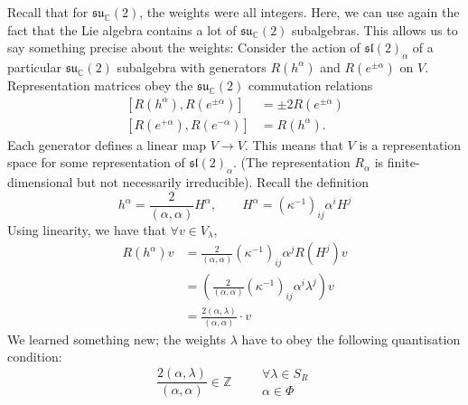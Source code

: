 Recall that for $\mathfrak{su}_{\mathbb{C}}(2)$, the weights were all integers.
Here, we can use again the fact that the Lie algebra contains a lot of $\mathfrak{su}_{\mathbb{C}}(2)$ subalgebras.  This allows us to say something precise about the weights:
Consider the action of $\mathfrak{sl}(2)_\alpha$ of a particular $\mathfrak{su}_{\mathbb{C}}(2)$ subalgebra
with generators $R(h^\alpha)$ and $R(e^{\pm\alpha})$ on $V$.
Representation matrices obey the  $\mathfrak{su}_{\mathbb{C}}(2)$  commutation relations
\begin{subequations}
  \begin{align}
    [R(h^\alpha), R(e^{\pm \alpha})] &= \pm 2 R(e^{\pm \alpha}) \\
    [R(e^{+\alpha}), R(e^{- \alpha})] &= R(h^\alpha).
  \end{align}
\end{subequations}
Each generator defines a linear map $V \to V$.
This means that $V$ is a representation space for some representation of $\mathfrak{sl}(2)_\alpha$. (The representation $R_\alpha$ is finite-dimensional but not necessarily  irreducible).
Recall the definition 
\begin{equation}
  h^\alpha = \frac{2}{(\alpha, \alpha)} H^\alpha, \qquad H^\alpha = (\kappa^{-1})_{ij} \alpha^{i} H^{j}
\end{equation}
Using linearity, we have that $\forall v \in V_{\lambda}$,
\begin{align}
  R(h^{\alpha}) v &= \frac{2}{(\alpha, \alpha)} (\kappa^{-1})_{ij} \alpha^{j} R(H^{j}) v \\
						   &= \left( \frac{2}{(\alpha, \alpha)} (\kappa^{-1})_{ij} \alpha^{i} \lambda^{j} \right) v \\
						   &= \frac{2 (\alpha, \lambda)}{(\alpha, \alpha)} \cdot v
\end{align}
We learned something new; the weights $\lambda$ have to obey the following quantisation condition:
 \begin{equation}
  \label{eq:23}
   \boxed{\frac{2(\alpha, \lambda)}{(\alpha, \alpha)} \in \mathbb{Z} \qquad
    \begin{gathered}
      \forall \lambda \in S_R \\
      \alpha \in \Phi
    \end{gathered}}
\end{equation}

